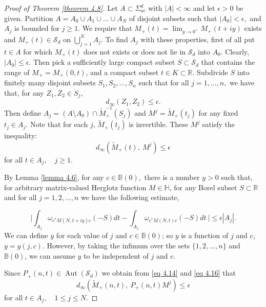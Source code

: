 \documentclass[reqno]{amsart}
\numberwithin{equation}{section}
\newcommand{\R}{\mathbb{R}}
\begin{document}
\begin{proof}[Proof of Theorem \ref{theorem 4.8}] Let $ A \subset \Sigma_{ac}^d$ with $|A| < \infty$ and let $\epsilon >0$ be given. Partition   $A = A_0\cup A_1 \cup \dots \cup A_N$ of disjoint 
 subsets such that $|A_0| <\epsilon,  $ and $ A_j$ is bounded for $j\geq 1.$ We require that $M_+(t) = \lim_{y \rightarrow 0^+} M_+(t+iy)$ exists and $M_+(t) \in \mathcal S_d$ on $ \bigcup_{j=1}^{N} A_j .$ To find $A_j$ with these properties, first of all put $t \in A$ for which $M_+(t)$ does not exists or does not lie in $\mathcal S_d $ into $A_0.$ Clearly, $|A_0|\leq \epsilon.$ Then pick a sufficiently large compact subset $S \subset \mathcal S_d$ that contains the range of $M_+= M_+(0,t)$, and a compact subset $ t\in K \subset \R .$ Subdivide $S$ into finitely many disjoint subsets   $ S_1, S_2,  \dots ,S_n$  such that for all $j=1, \dots, n, $ we have that, for any $ Z_1, Z_2 \in S_j,$   $$ d_{\infty}(Z_1, Z_2) \leq \epsilon .$$ Then define $A_j = (A \setminus A_0)\cap \tilde M_+^{-1}(S_j)$ and $ M^j = \tilde M_+(t_j) $ for any fixed $ t_j \in A_j. $ Note that for each $j$, $\tilde M_+(t_j)$ is invertible. These $ M^j $ satisfy the  inequality:  \begin{equation} \label{eq 4.16} d_{\infty}(\tilde M_+(t), \ M^j) \leq \epsilon \end{equation} for all $t \in A_j,\quad j\geq 1 .$
 
 By Lemma \ref{lemma 4.6}, for any $c\in \mathbb B(0),$ there is a number $y>0$ such that, for arbitrary matrix-valued Herglotz function $M \in \mathbb H$, for any Borel subset $S\subset \R$ and for all $j =1,2, \dots, n$ we have the following estimate,
 
 \begin{equation} \label{eq 4.22}  \Big | \int_{A_j} \omega_{c^*  M (N,t+iy)c} (-S) dt - \int_{A_j} \omega_{c^*  M (N,t)c}(-S) dt\  \Big | \leq \epsilon |A_j| .\end{equation}
We can define $y$ for each value of $j$ and $c\in \mathbb B(0)$; so $y$ is a function of $j $ and $c$, $ y =y(j,c)$. However, by taking the infimum over the sets $ \{1,2, \dots, n\}$ and $\mathbb B(0)$, we can assume $y$ to be independent of $j$ and $c$.

Since $P_+(n,t) \in  \operatorname{Aut}(\mathcal S_d)$ we obtain from \eqref{eq 4.14} and \eqref{eq 4.16}
that
 \begin{equation} \label{eq 4.18} d_{\infty}(\tilde M_+(n,t), \ P_+(n,t) M^j) \leq \epsilon \end{equation}
 for all $t \in A_j,\quad  1\leq j \leq N .$


\end{proof}
\end{document}
